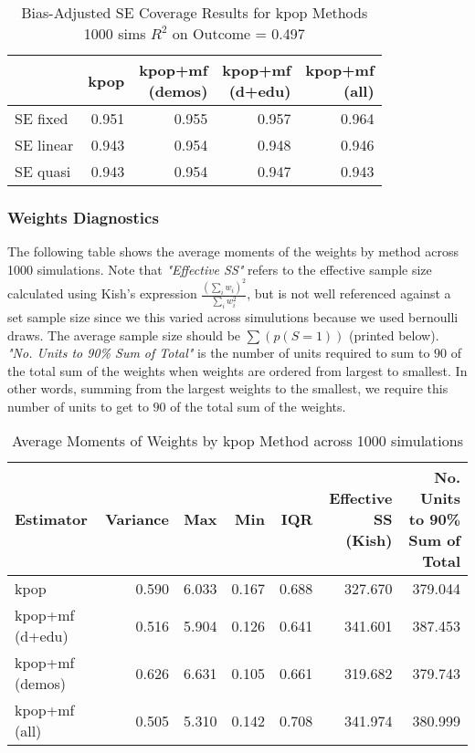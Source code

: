 \documentclass[
]{article}
\begin{document}
\begin{table}[!h]

\caption{\label{tab:coverage}Bias-Adjusted SE Coverage Results for kpop Methods 1000 sims $R^2$ on Outcome =  0.497}
\centering
\begin{tabular}[t]{lrrrr}
\toprule
  & kpop & \makecell[c]{kpop+mf\\(demos)} & \makecell[r]{kpop+mf\\(d+edu)} & \makecell[l]{kpop+mf\\(all)}\\
\midrule
SE fixed & 0.951 & 0.955 & 0.957 & 0.964\\
SE linear & 0.943 & 0.954 & 0.948 & 0.946\\
SE quasi & 0.943 & 0.954 & 0.947 & 0.943\\
\bottomrule
\end{tabular}
\end{table}

\hypertarget{weights-diagnostics}{%
\subsubsection{Weights Diagnostics}\label{weights-diagnostics}}

The following table shows the average moments of the weights by method
across 1000 simulations. Note that \textit{"Effective SS"} refers to the
effective sample size calculated using Kish's expression
\(\frac{\left(\sum_i w_i\right)^2}{\sum_i w_i^2}\), but is not well
referenced against a set sample size since we this varied across
simulutions because we used bernoulli draws. The average sample size
should be \(\sum(p(S=1))\) (printed below).
\textit{"No. Units to 90\% Sum of Total"} is the number of units
required to sum to \(90%
\) of the total sum of the weights when weights are ordered from largest
to smallest. In other words, summing from the largest weights to the
smallest, we require this number of units to get to \(90%
\) of the total sum of the weights.

\begin{table}[!h]

\caption{\label{tab:weights}Average Moments of Weights by kpop Method across 1000 simulations}
\centering
\begin{tabular}[t]{lrrrrrr}
\toprule
Estimator & Variance & Max & Min & IQR & \makecell[r]{Effective SS\\(Kish)} & \makecell[l]{No. Units to 90\%\\Sum of Total}\\
\midrule
kpop & 0.590 & 6.033 & 0.167 & 0.688 & 327.670 & 379.044\\
kpop+mf (d+edu) & 0.516 & 5.904 & 0.126 & 0.641 & 341.601 & 387.453\\
kpop+mf (demos) & 0.626 & 6.631 & 0.105 & 0.661 & 319.682 & 379.743\\
kpop+mf (all) & 0.505 & 5.310 & 0.142 & 0.708 & 341.974 & 380.999\\
\bottomrule
\end{tabular}
\end{table}
\end{document}
